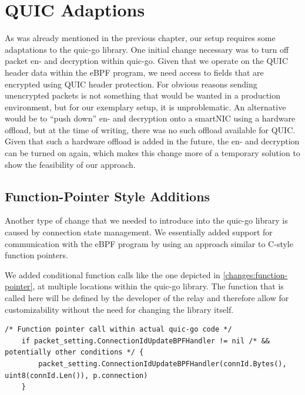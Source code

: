 \section{QUIC Adaptions}\label{sec:quic_adaptions}
As was already mentioned in the previous chapter, our setup requires some adaptations
to the quic-go library.
One initial change necessary was to turn off packet en- and decryption within quic-go.
Given that we operate on the QUIC header data within the eBPF program, we need access 
to fields that are encrypted using QUIC header protection.
For obvious reasons sending unencrypted packets is not something that would be wanted in 
a production environment, but for our exemplary setup, it is unproblematic. 
An alternative would be to ``push down'' en- and decryption onto a smartNIC using a 
hardware offload, but at the time of writing, there was no such offload available for QUIC\@. 
Given that such a hardware offload is added in the future, the en- and decryption can be
turned on again, which makes this change more of a temporary solution to show the feasibility
of our approach.

\subsection{Function-Pointer Style Additions}
Another type of change that we needed to introduce into the quic-go library is caused by 
connection state management.
We essentially added support for communication with the eBPF program by using an 
approach similar to C-style function pointers.

We added conditional function calls like the one depicted in 
\autoref{changes:function-pointer}, at multiple locations 
within the quic-go library.
The function that is called here will be defined by the developer of the relay and 
therefore allow for customizability without the need for changing the library itself.

\vspace{0.5cm}
\noindent\begin{minipage}{\textwidth}
\begin{lstlisting}[style=GoStyle, label=changes:function-pointer, caption=An example of a function-pointer addition to the quic-go library.]
    /* Function pointer call within actual quic-go code */
    if packet_setting.ConnectionIdUpdateBPFHandler != nil /* && potentially other conditions */ {
	    packet_setting.ConnectionIdUpdateBPFHandler(connId.Bytes(), uint8(connId.Len()), p.connection)
	}
\end{lstlisting}
\end{minipage}

